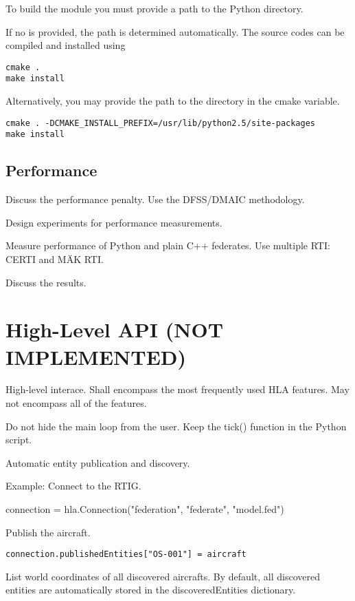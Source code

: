 \documentclass{howto}
\begin{document}
To build the  module you must provide a path to the Python
 directory.

If no  is provided, the path is determined
automatically. The source codes can be compiled and installed using
\begin{verbatim}
cmake .
make install
\end{verbatim}

Alternatively, you may provide the path to the  directory
in the  cmake variable.
\begin{verbatim}
cmake . -DCMAKE_INSTALL_PREFIX=/usr/lib/python2.5/site-packages
make install
\end{verbatim}

\subsection{Performance}

Discuss the performance penalty. Use the DFSS/DMAIC methodology.

Design experiments for performance measurements.

Measure performance of Python and plain C++ federates. Use multiple RTI: CERTI and MÄK RTI.

Discuss the results.




\section{High-Level API (NOT IMPLEMENTED)}
High-level interace. Shall encompass the most frequently used HLA features. May not encompass all of the features.

Do not hide the main loop from the user. Keep the tick() function in the Python script.

Automatic entity publication and discovery.

Example:
Connect to the RTIG.

connection = hla.Connection("federation", "federate", "model.fed")

Publish the aircraft.

\begin{verbatim}
connection.publishedEntities["OS-001"] = aircraft
\end{verbatim}

List world coordinates of all discovered aircrafts. By default, all discovered
entities are automatically stored in the discoveredEntities dictionary.
\end{document}
